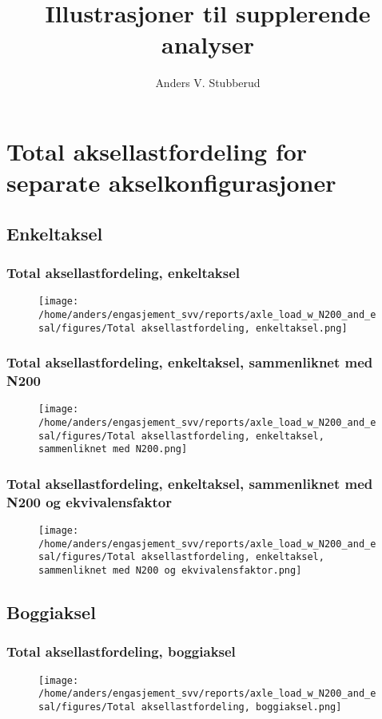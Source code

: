\documentclass{article}
\begin{document}
\title{Illustrasjoner til supplerende analyser}
\author{Anders V. Stubberud}
\maketitle
\tableofcontents
\newpage
\section{Total aksellastfordeling for separate akselkonfigurasjoner}
\subsection{Enkeltaksel}
\subsubsection{Total aksellastfordeling, enkeltaksel}
\begin{figure}[H]
\centering
\texttt{[image: /home/anders/engasjement\_svv/reports/axle\_load\_w\_N200\_and\_esal/figures/Total aksellastfordeling, enkeltaksel.png]}
\end{figure}
\subsubsection{Total aksellastfordeling, enkeltaksel, sammenliknet med N200}
\begin{figure}[H]
\centering
\texttt{[image: /home/anders/engasjement\_svv/reports/axle\_load\_w\_N200\_and\_esal/figures/Total aksellastfordeling, enkeltaksel, sammenliknet med N200.png]}
\end{figure}
\subsubsection{Total aksellastfordeling, enkeltaksel, sammenliknet med N200 og ekvivalensfaktor}
\begin{figure}[H]
\centering
\texttt{[image: /home/anders/engasjement\_svv/reports/axle\_load\_w\_N200\_and\_esal/figures/Total aksellastfordeling, enkeltaksel, sammenliknet med N200 og ekvivalensfaktor.png]}
\end{figure}
\subsection{Boggiaksel}
\subsubsection{Total aksellastfordeling, boggiaksel}
\begin{figure}[H]
\centering
\texttt{[image: /home/anders/engasjement\_svv/reports/axle\_load\_w\_N200\_and\_esal/figures/Total aksellastfordeling, boggiaksel.png]}
\end{figure}
\end{document}
